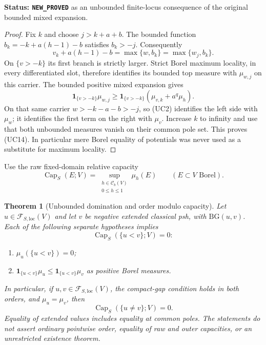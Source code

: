 \documentclass[11pt,a4paper]{article}
\numberwithin{equation}{section}
\newtheorem{theorem}{Theorem}[section]
\theoremstyle{definition}
\theoremstyle{remark}
\begin{document}
\noindent\textbf{Status: \texttt{NEW\_PROVED}} as an unbounded
finite-locus consequence of the original bounded mixed expansion.

\begin{proof}
Fix $k$ and choose $j>k+a+b$. The bounded function
$b_k=-k+a(h-1)-b$ satisfies $b_k>-j$. Consequently
\[
 v_k+a(h-1)-b
       =\max\{w,b_k\}=\max\{w_j,b_k\}.
\]
On $\{v>-k\}$ its first branch is strictly larger. Strict
Borel maximum locality, in every differentiated slot, therefore
identifies its bounded top measure with $\mu_{w,j}$ on this
carrier. The bounded positive mixed expansion gives
\[
 \mathbf1_{\{v>-k\}}\mu_{w,j}
 \geq\mathbf1_{\{v>-k\}}
                    (\mu_{v,k}+a^q\mu_h).
\]
On that same carrier $w>-k-a-b>-j$, so (UC2) identifies
the left side with $\mu_w$; it identifies the first term
on the right with $\mu_v$. Increase $k$ to infinity and
use that both unbounded measures vanish on their common pole
set. This proves (UC14). In particular mere Borel equality of
potentials was never used as a substitute for maximum locality.
\end{proof}

Use the raw fixed-domain relative capacity
\[
 \operatorname{Cap}_S(E;V)
    =\sup_{\substack{h\in\mathcal C_b(V)\\0\leq h\leq1}}
                              \mu_h(E)
 \qquad(E\subset V\text{ Borel}).
 \tag{UC15}
\]

\begin{theorem}[Unbounded domination and order modulo capacity]
\label{thm:r11-unbounded-capacity-domination}
Let $u\in\mathcal F_{S,\mathrm{loc}}(V)$ and let $v$ be
negative extended classical psh, with $\mathrm{BG}(u,v)$.
Each of the following separate hypotheses implies
\[
                \operatorname{Cap}_S(\{u<v\};V)=0:
 \tag{UC16}
\]
\begin{enumerate}
\item $\mu_u(\{u<v\})=0$;
\item $\mathbf1_{\{u<v\}}\mu_u\leq
       \mathbf1_{\{u<v\}}\mu_v$ as positive Borel measures.
\end{enumerate}
In particular, if $u,v\in\mathcal F_{S,\mathrm{loc}}(V)$,
the compact-gap condition holds in both orders, and
$\mu_u=\mu_v$, then
\[
           \operatorname{Cap}_S(\{u\ne v\};V)=0.
 \tag{UC17}
\]
Equality of extended values includes equality at common poles.
The statements do not assert ordinary pointwise order, equality
of raw and outer capacities, or an unrestricted existence theorem.
\end{theorem}
\end{document}
